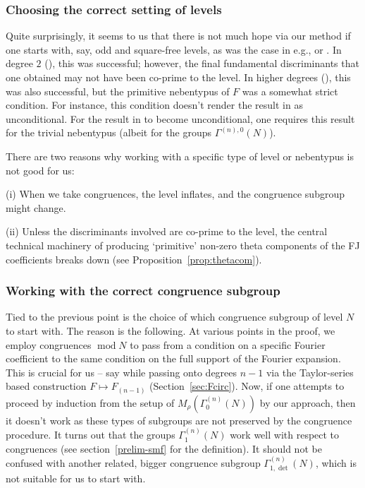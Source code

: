 \documentclass[11pt]{amsart}
\numberwithin{equation}{section}
\renewcommand*{\mod}{\operatorname{mod}}
\begin{document}
\subsubsection{Choosing the correct setting of levels} \label{intro-lev}
Quite surprisingly, it seems to us that there is not much hope via our method if one starts with, say, odd and square-free levels, as was the case in e.g., \cite{saha2013yoshida} or \cite{washburn2025certain}. In degree $2$ (\cite{saha2013yoshida}), this was successful; however, the final fundamental discriminants that one obtained may not have been co-prime to the level. In higher degrees (\cite{washburn2025certain}), this was also successful, but the primitive nebentypus of $F$ was a somewhat strict condition. For instance, this condition doesn't render the result in \cite{eischen2024algebraicity} as unconditional.
For the result in \cite{eischen2024algebraicity} to become unconditional, one requires this result for the trivial nebentypus (albeit for the groups $\Gamma^{(n),0}(N)$).

There are two reasons why working with a specific type of level or nebentypus is not good for us:

(i) When we take congruences, the level inflates, and the congruence subgroup might change.

(ii) Unless the discriminants involved are co-prime to the level, the central technical machinery of producing `primitive' non-zero theta components of the FJ coefficients breaks down (see  Proposition~\ref{prop:thetacom}).

\subsubsection{Working with the correct congruence subgroup} \label{sbgp}
Tied to the previous point is the choice of which congruence subgroup of level $N$ to start with. The reason is the following.
At various points in the proof, we employ congruences $\mod N$ to pass from a condition on a specific Fourier coefficient to the same condition on the full support of the Fourier expansion. This is crucial for us -- say while passing onto degrees $n-1$ via the Taylor-series based construction $F \mapsto F_{(n-1)}$ (Section~\ref{sec:Fcirc}).
Now, if one attempts to proceed by induction from the setup of $M_\rho(\Gamma_0^{(n)}(N))$ by our approach, then it doesn't work as these types of subgroups are not preserved by the congruence procedure. It turns out that the groups $\Gamma_1^{(n)}(N)$ work well with respect to congruences (see section~\ref{prelim-smf} for the definition). It should not be confused with another related, bigger congruence subgroup $\Gamma_{1, \det}^{(n)}(N)$, which is not suitable for us to start with. 
\end{document}
